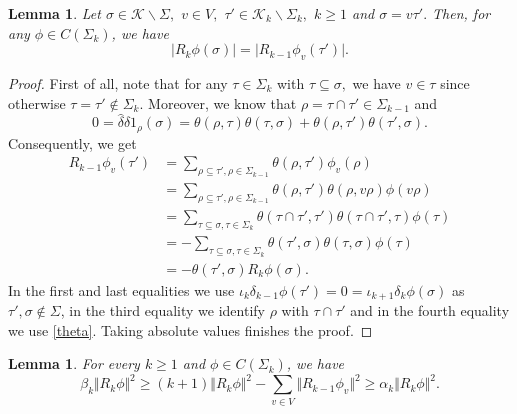 \documentclass[10pt]{amsart}
\newtheorem{lemma}[theorem]{Lemma}
\theoremstyle{definition}
\newcommand{\K}{\mathcal{K}}
\begin{document}
\begin{lemma}\label{R_k-R_k-1}
    Let $\sigma\in \K\backslash \Sigma,$ $ v\in V,$ $\tau'\in \K_k\backslash \Sigma_k,$ $k\geq 1$ and $\sigma = v\tau'.$ Then, for any $\phi\in C(\Sigma_k)$, we have
    \[\vert R_{k}\phi(\sigma)\vert = \vert R_{k-1}\phi_v(\tau')\vert.\]
\end{lemma}
\begin{proof}
    First of all, note that for any $\tau\in\Sigma_k$ with $\tau\subseteq\sigma,$ we have
    $v\in\tau$ since otherwise $\tau = \tau'\notin\Sigma_k.$ Moreover, we know that $\rho = \tau\cap\tau'\in\Sigma_{k-1}$ and
    \begin{equation}\label{theta}
        0 = \widehat\delta\widehat\delta1_{\rho}(\sigma) = \theta(\rho,\tau)\theta(\tau,\sigma)+\theta(\rho,\tau')\theta(\tau',\sigma).
    \end{equation}
    Consequently, we get
    \begin{align*}
        R_{k-1}\phi_v(\tau') &=\sum_{\rho\subseteq\tau',\rho\in\Sigma_{k-1}} \theta(\rho,\tau')\phi_v(\rho)\\
        &= \sum_{\rho\subseteq\tau',\rho\in\Sigma_{k-1}} \theta(\rho,\tau')\theta(\rho,v\rho)\phi(v\rho)\\
        &= \sum_{\tau\subseteq\sigma,\tau\in\Sigma_k}\theta(\tau\cap\tau',\tau')\theta(\tau\cap\tau',\tau)\phi(\tau)\\
        &= -\sum_{\tau\subseteq\sigma,\tau\in\Sigma_k}\theta(\tau',\sigma)\theta(\tau,\sigma)\phi(\tau)\\
        &= -\theta(\tau',\sigma) R_k\phi(\sigma).
    \end{align*}
 In the first and last equalities we use $\iota_{k}\delta_{k-1}\phi(\tau') = 0=\iota_{k+1}\delta_{k}\phi(\sigma)$ as $\tau',\sigma\notin \Sigma$, in the  third equality we identify $\rho$ with $\tau\cap\tau'$ and in the fourth equality we use \eqref{theta}. Taking absolute values finishes the proof.
\end{proof}
\begin{lemma}\label{errorsum}
    For every $k\geq 1$ and $\phi\in C(\Sigma_k)$, we have
    \begin{equation*}
        \beta_k\Vert R_k\phi\Vert^2\geq(k+1)\Vert R_k\phi\Vert^2-\sum_{v\in V}\Vert R_{k-1}\phi_v\Vert^2\geq \alpha_k\Vert R_k\phi\Vert^2.
    \end{equation*}
\end{lemma}
\end{document}
